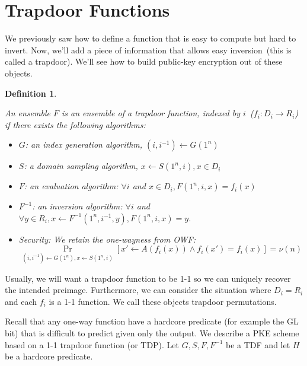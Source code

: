 \documentclass{article}
\newtheorem{defn}[thm]{Definition}
\newenvironment{definition}{\begin{defn}\begin{em}}%
{\end{em}\end{defn}}
\begin{document}
\section{Trapdoor Functions}
We previously saw how to define a function that is easy to compute but hard to invert.  Now, we'll add a piece of information that allows easy inversion~(this is called a trapdoor).  We'll see how to build public-key encryption out of these objects.
\begin{definition}
An ensemble $F$ is an ensemble of a \emph{trapdoor function}, indexed by $i$~($f_i:D_i\rightarrow R_i$) if there exists the following algorithms:
\begin{itemize}
\item $G$: an index generation algorithm, $(i, i^{-1})\leftarrow G(1^n)$
\item $S$: a domain sampling algorithm, $x\leftarrow S(1^n, i), x\in D_i$
\item $F$: an evaluation algorithm: $\forall i$ and $x\in D_i, F(1^n, i, x) = f_i(x)$
\item $F^{-1}$: an inversion algorithm: $\forall i$ and $\forall y\in R_i, x\leftarrow F^{-1}(1^n, i^{-1}, y) , F(1^n, i, x) = y$.
\item Security: We retain the one-wayness from OWF: 
\[ \Pr_{(i, i^{-1})\leftarrow G(1^n), x\leftarrow S(1^n, i)}[x'\leftarrow A(f_i(x))   \wedge f_i(x') = f_i(x)] = \nu(n)
\]
\end{itemize}
\end{definition}
Usually, we will want a trapdoor function to be 1-1 so we can uniquely recover the intended preimage.  Furthermore, we can consider the situation where $D_i = R_i$ and each $f_i$ is a 1-1 function.  We call these objects trapdoor permutations.

Recall that any one-way function have a hardcore predicate (for example the GL bit) that is difficult to predict given only the output.  We describe a PKE scheme based on a 1-1 trapdoor function (or TDP).  Let $G, S, F, F^{-1}$ be a TDF and let $H$ be a hardcore predicate.
\end{document}
